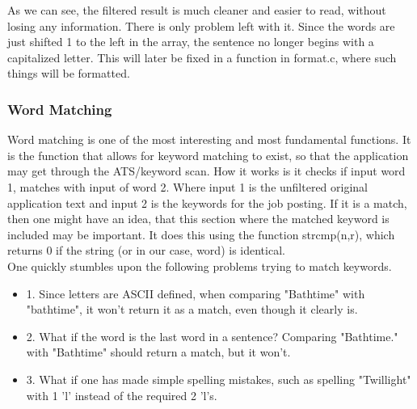 As we can see, the filtered result is much cleaner and easier to read, without losing any information.
There is only problem left with it. Since the words are just shifted 1 to the left in the array, the sentence no longer begins
with a capitalized letter. This will later be fixed in a function in format.c, where such things will be formatted.

\subsubsection{Word Matching}
Word matching is one of the most interesting and most fundamental functions. 
It is the function that allows for keyword matching to exist, so that the application
may get through the ATS/keyword scan. How it works is it checks if input word 1, matches with input of word 2.
Where input 1 is the unfiltered original application text and input 2 is the keywords for the job posting.
If it is a match, then one might have an idea, that this section where the matched keyword is included may be important.
It does this using the function strcmp(n,r), which returns 0 if the string (or in our case, word) is identical.
\\
One quickly stumbles upon the following problems trying to match keywords.
\begin{itemize}
  \item 1. Since letters are ASCII defined, when comparing "Bathtime" with "bathtime", it won't return it as a match, even though it clearly is.
  \item 2. What if the word is the last word in a sentence? Comparing "Bathtime." with "Bathtime" should return a match, but it won't.
  \item 3. What if one has made simple spelling mistakes, such as spelling "Twillight" with 1 'l' instead of the required 2 'l's.
\end{itemize}

